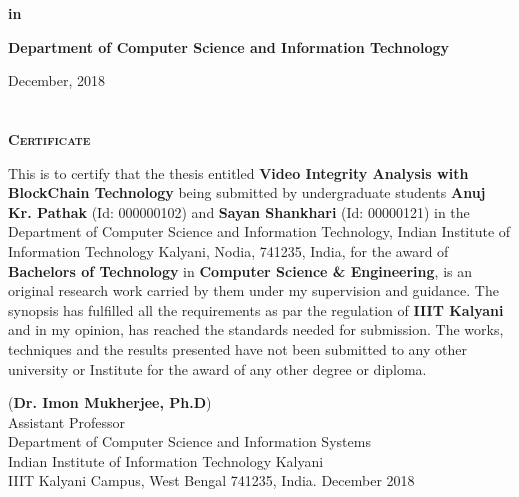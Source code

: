 \documentclass[a4paper,12pt]{report}
\begin{document}
\begin{titlepage}
\begin{center}
\textbf{{\large{in}}}
\end{center}

\begin{center}
\textbf{\Large{Department of Computer Science and Information Technology}}\\
\end{center}

\vspace{0.5cm}
\begin{center}
\Large{December, 2018}
\end{center}
\end{titlepage}


\newpage
\chapter*{}
\setcounter{page}{1} 
\begin{center}
\textbf{\textsc{\Large Certificate}}\\[0.75cm]
\end{center}
\onehalfspacing This is to certify that the thesis entitled
\textbf{Video Integrity Analysis with BlockChain Technology} being submitted by undergraduate students \textbf{Anuj Kr. Pathak} (Id: 000000102) and \textbf{Sayan Shankhari} (Id: 00000121) in the Department of Computer Science and Information Technology, Indian Institute of Information Technology Kalyani, Nodia, 741235, India, for the award of \textbf{Bachelors of Technology} in \textbf{Computer Science \& Engineering}, is an original research work carried by them under my supervision and guidance. The synopsis has fulfilled all the requirements as par the regulation of \textbf{IIIT Kalyani} and in my opinion, has reached the standards needed for submission. The works, techniques and the results presented have not been submitted to any other university or Institute for the award of any other degree or diploma.\\
\bigskip
\bigskip
\bigskip
\bigskip
\bigskip
\bigskip
\bigskip
\begin{flushleft}
\bigskip
(\textbf{Dr. Imon Mukherjee, Ph.D})\\
\smallskip
Assistant Professor\\
Department of Computer Science and Information Systems\\
Indian Institute of Information Technology Kalyani\\
IIIT Kalyani Campus, West Bengal 741235, India.
December 2018\\
\end{flushleft}
\end{document}

